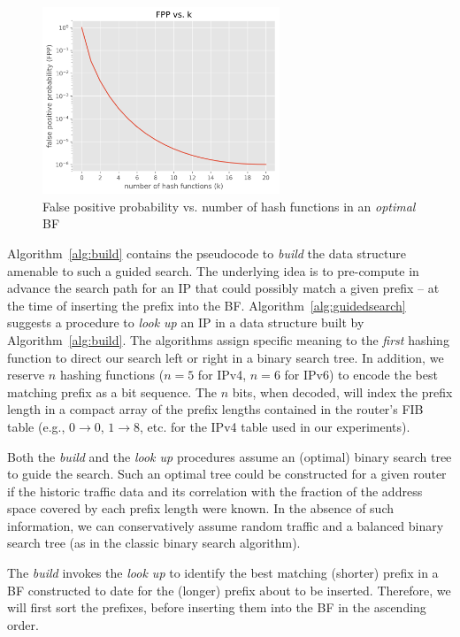 \documentclass[conference,compsoc]{IEEEtran}
\begin{document}
\begin{figure}[h]
\centering
\includegraphics[height=2.2in]{../img/PvsK.png}
  \caption{False positive probability vs. number of hash functions in an \emph{optimal} BF}
\label{fig:fpp}
\end{figure}


Algorithm~\ref{alg:build} contains the pseudocode to \emph{build} the data 
structure amenable to such a guided search. The underlying idea is to
pre-compute in advance the search path for an IP that could possibly match a given
prefix -- at the time of inserting the prefix into the BF.
Algorithm~\ref{alg:guidedsearch} suggests
a procedure to \emph{look up} an IP in a data structure built by
Algorithm~\ref{alg:build}. The
algorithms assign specific meaning to the \emph{first} hashing function
to direct our search left or right in a binary search tree. In addition, we
reserve $n$ hashing functions ($n=5$ for IPv4, $n=6$ for IPv6) to encode
the best matching prefix as a bit sequence. The $n$ bits, when decoded,
will index the prefix length in a compact array of the prefix lengths
contained in the router's FIB table (e.g., $0 \rightarrow 0$, $1 \rightarrow 8$, etc.
for the IPv4 table used in our experiments).

Both the \emph{build} and the \emph{look up} procedures assume an (optimal)
binary search tree to guide the search. Such an optimal tree could be
constructed for a given router if the historic traffic data and its 
correlation with the fraction of the address space covered by each prefix length
were known. In the absence of such information, we can conservatively
assume random traffic and a balanced binary search tree (as in the
classic binary search algorithm).

The \emph{build} invokes the \emph{look up} to identify the
best matching (shorter) prefix in a BF constructed to date for the 
(longer) prefix
about to be inserted. Therefore, we will first sort the prefixes, before
inserting them into the BF in the ascending order.
\end{document}
